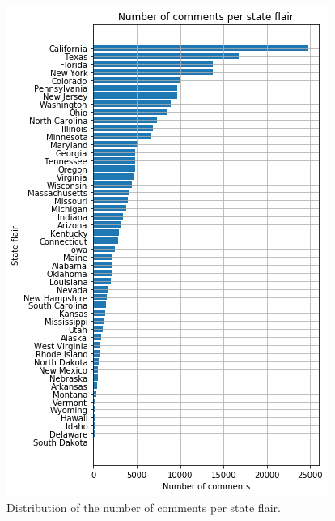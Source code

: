 \documentclass[11pt]{article}
\begin{document}
\begin{figure}
\centering
\includegraphics[scale=0.35]{Images/flair-distribution.jpg}
\caption{Distribution of the number of comments per state flair.}
\label{flair-distribution}
\end{figure}
\end{document}
